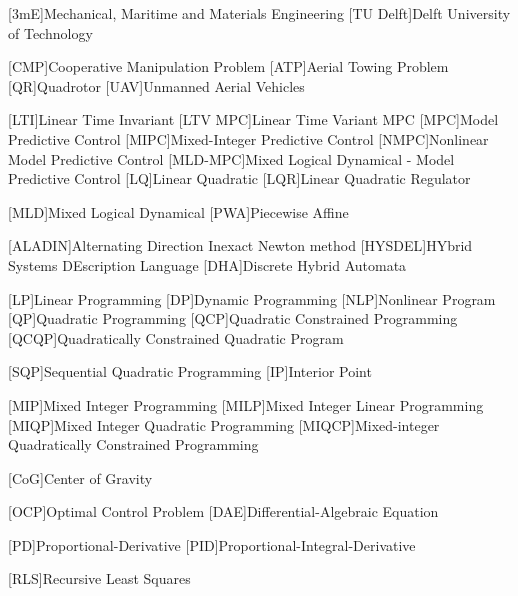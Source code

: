 
\begin{acronym}[\hspace{0.8in}] %
	[3{m}E]{Mechanical, Maritime and Materials Engineering}%
	[TU D{elft}]{Delft University of Technology}%

	[CMP]{Cooperative Manipulation Problem}
	[ATP]{Aerial Towing Problem}
	[QR]{Quadrotor}
	[UAV]{Unmanned Aerial Vehicles}
	
	[LTI]{Linear Time Invariant}
	[LTV MPC]{Linear Time Variant MPC}
	[MPC]{Model Predictive Control}
	[MIPC]{Mixed-Integer Predictive Control}	
	[NMPC]{Nonlinear Model Predictive Control}
	[MLD-MPC]{Mixed Logical Dynamical - Model Predictive Control}
	[LQ]{Linear Quadratic}
	[LQR]{Linear Quadratic Regulator}

	[MLD]{Mixed Logical Dynamical}
	[PWA]{Piecewise Affine}

	[ALADIN]{Alternating Direction Inexact Newton method}
	[HYSDEL]{HYbrid Systems DEscription Language}	
	[DHA]{Discrete Hybrid Automata}
	
	[LP]{Linear Programming}
	[DP]{Dynamic Programming}	
	[NLP]{Nonlinear Program}
	[QP]{Quadratic Programming}
	[QCP]{Quadratic Constrained Programming}	
	[QCQP]{Quadratically Constrained Quadratic Program}
	
	[SQP]{Sequential Quadratic Programming}
	[IP]{Interior Point}
	
	[MIP]{Mixed Integer Programming}
	[MILP]{Mixed Integer Linear Programming}
	[MIQP]{Mixed Integer Quadratic Programming}
	[MIQCP]{Mixed-integer Quadratically Constrained Programming}

	
	[CoG]{Center of Gravity}
	
	[OCP]{Optimal Control Problem}
	[DAE]{Differential-Algebraic Equation}
	
	[PD]{Proportional-Derivative}
	[PID]{Proportional-Integral-Derivative}
	
	[RLS]{Recursive Least Squares}



\end{acronym}